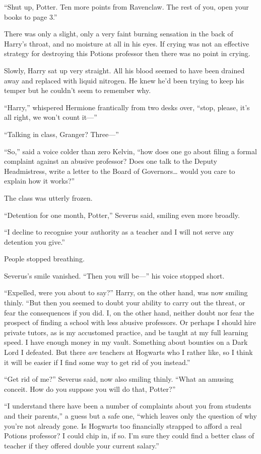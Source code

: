 ``Shut up, Potter. Ten more points from Ravenclaw. The rest of you, open
your books to page 3.''

There was only a slight, only a very faint burning sensation in the back
of Harry's throat, and no moisture at all in his eyes. If crying was not
an effective strategy for destroying this Potions professor then there
was no point in crying.

Slowly, Harry sat up very straight. All his blood seemed to have been
drained away and replaced with liquid nitrogen. He knew he'd been trying
to keep his temper but he couldn't seem to remember why.

``Harry,'' whispered Hermione frantically from two desks over, ``stop,
please, it's all right, we won't count it---''

``Talking in class, Granger? Three---''

``So,'' said a voice colder than zero Kelvin, ``how does one go about
filing a formal complaint against an abusive professor? Does one talk to
the Deputy Headmistress, write a letter to the Board of
Governors\ldots{} would you care to explain how it works?''

The class was utterly frozen.

``Detention for one month, Potter,'' Severus said, smiling even more
broadly.

``I decline to recognise your authority as a teacher and I will not
serve any detention you give.''

People stopped breathing.

Severus's smile vanished. ``Then you will be---'' his voice stopped
short.

``Expelled, were you about to say?'' Harry, on the other hand, was now
smiling thinly. ``But then you seemed to doubt your ability to carry out
the threat, or fear the consequences if you did. I, on the other hand,
neither doubt nor fear the prospect of finding a school with less
abusive professors. Or perhaps I should hire private tutors, as is my
accustomed practice, and be taught at my full learning speed. I have
enough money in my vault. Something about bounties on a Dark Lord I
defeated. But there \emph{are} teachers at Hogwarts who I rather like,
so I think it will be easier if I find some way to get rid of you
instead.''

``Get rid of me?'' Severus said, now also smiling thinly. ``What an
amusing conceit. How do you suppose you will do that, Potter?''

``I understand there have been a number of complaints about you from
students and their parents,'' a guess but a safe one, ``which leaves
only the question of why you're not already gone. Is Hogwarts too
financially strapped to afford a real Potions professor? I could chip
in, if so. I'm sure they could find a better class of teacher if they
offered double your current salary.''

